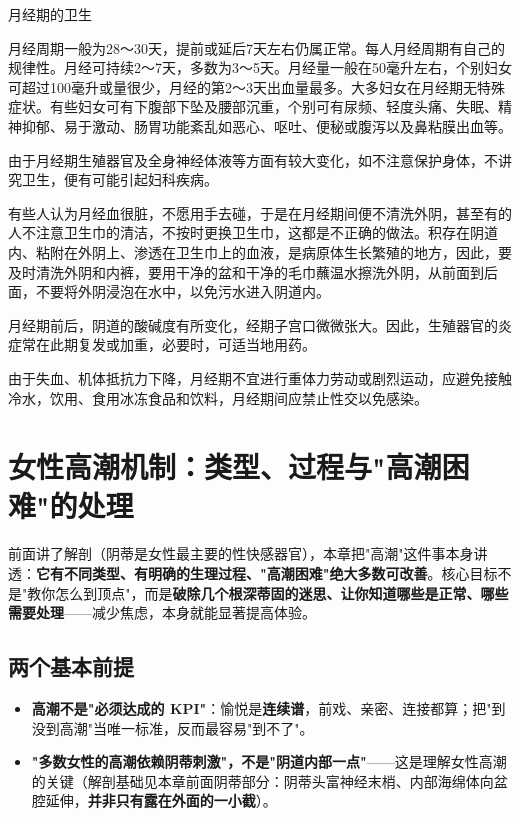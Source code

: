 \documentclass[12pt,UTF8,openany]{ctexbook}
\begin{document}
月经期的卫生

月经周期一般为28～30天，提前或延后7天左右仍属正常。每人月经周期有自己的规律性。月经可持续2～7天，多数为3～5天。月经量一般在50毫升左右，个别妇女可超过100毫升或量很少，月经的第2～3天出血量最多。大多妇女在月经期无特殊症状。有些妇女可有下腹部下坠及腰部沉重，个别可有尿频、轻度头痛、失眠、精神抑郁、易于激动、肠胃功能紊乱如恶心、呕吐、便秘或腹泻以及鼻粘膜出血等。

由于月经期生殖器官及全身神经体液等方面有较大变化，如不注意保护身体，不讲究卫生，便有可能引起妇科疾病。

有些人认为月经血很脏，不愿用手去碰，于是在月经期间便不清洗外阴，甚至有的人不注意卫生巾的清洁，不按时更换卫生巾，这都是不正确的做法。积存在阴道内、粘附在外阴上、渗透在卫生巾上的血液，是病原体生长繁殖的地方，因此，要及时清洗外阴和内裤，要用干净的盆和干净的毛巾蘸温水擦洗外阴，从前面到后面，不要将外阴浸泡在水中，以免污水进入阴道内。

月经期前后，阴道的酸碱度有所变化，经期子宫口微微张大。因此，生殖器官的炎症常在此期复发或加重，必要时，可适当地用药。

由于失血、机体抵抗力下降，月经期不宜进行重体力劳动或剧烈运动，应避免接触冷水，饮用、食用冰冻食品和饮料，月经期间应禁止性交以免感染。

\chapter{女性高潮机制：类型、过程与"高潮困难"的处理}
\label{chap:female-orgasm}

前面讲了解剖（阴蒂是女性最主要的性快感器官），本章把"高潮"这件事本身讲透：\textbf{它有不同类型、有明确的生理过程、"高潮困难"绝大多数可改善}。核心目标不是"教你怎么到顶点"，而是\textbf{破除几个根深蒂固的迷思、让你知道哪些是正常、哪些需要处理}——减少焦虑，本身就能显著提高体验。

\section{两个基本前提}

\begin{itemize}[leftmargin=2em,itemsep=0.3em]
  \item \textbf{高潮不是"必须达成的 KPI"}：愉悦是\textbf{连续谱}，前戏、亲密、连接都算；把"到没到高潮"当唯一标准，反而最容易"到不了"。
  \item \textbf{"多数女性的高潮依赖阴蒂刺激"，不是"阴道内部一点"}——这是理解女性高潮的关键（解剖基础见本章前面阴蒂部分：阴蒂头富神经末梢、内部海绵体向盆腔延伸，\textbf{并非只有露在外面的一小截}）。
\end{itemize}
\end{document}
